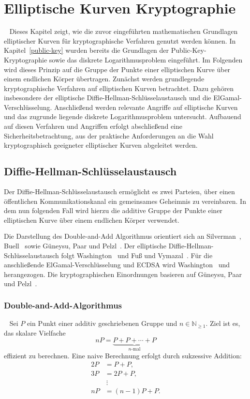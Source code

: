 \chapter{Elliptische Kurven Kryptographie}~\label{sec:kryptographie}
Dieses Kapitel zeigt, wie die zuvor eingeführten mathematischen
Grundlagen elliptischer Kurven für kryptographische Verfahren genutzt
werden können. In Kapitel~\ref{public-key} wurden bereits die Grundlagen der Public-Key-Kryptographie sowie das diskrete Logarithmusproblem eingeführt. Im Folgenden wird dieses Prinzip auf die Gruppe der Punkte einer elliptischen Kurve über einem endlichen Körper übertragen. Zunächst werden grundlegende kryptographische Verfahren auf
elliptischen Kurven betrachtet. Dazu gehören insbesondere der
elliptische Diffie-Hellman-Schlüsselaustausch und die
ElGamal-Verschlüsselung. Anschließend werden relevante Angriffe auf
elliptische Kurven und das zugrunde liegende diskrete
Logarithmusproblem untersucht. Aufbauend auf diesen Verfahren und
Angriffen erfolgt abschließend eine Sicherheitsbetrachtung, aus der
praktische Anforderungen an die Wahl kryptographisch geeigneter
elliptischer Kurven abgeleitet werden.
\section{Diffie-Hellman-Schlüsselaustausch}
Der Diffie-Hellman-Schlüsselaustausch ermöglicht es zwei Parteien,
über einen öffentlichen Kommunikationskanal ein gemeinsames Geheimnis
zu vereinbaren. In dem nun folgenden Fall wird hierzu die additive Gruppe der Punkte einer elliptischen Kurve über einem endlichen Körper
verwendet.

Die Darstellung des Double-and-Add Algorithmus orientiert sich
an Silverman~\cite[S.~30--31]{silverman06}, Buell~\cite[S.~217--218]{buell24} sowie Güneysu, Paar und Pelzl~\cite[S.~288]{guneysu24}. Der elliptische Diffie-Hellman-Schlüsselaustausch folgt Washington~\cite[S.~170--172]{washington08} und Fuß und Vymazal~\cite[S.~195]{fuß25}. Für die anschließende ElGamal-Verschlüsselung und ECDSA wird Washington~\cite[S.~174--176, 179--180]{washington08} und~\cite[104--109]{werner02} herangezogen. Die kryptographischen Einordnungen basieren auf Güneysu, Paar und Pelzl~\cite[S.~291]{guneysu24}.

\subsection{Double-and-Add-Algorithmus}~\label{sec:double-and-add}
Sei $P$ ein Punkt einer additiv geschriebenen Gruppe und
$n \in \mathbb{N}_{\geq 1}$. Ziel ist es, das skalare Vielfache
\[
    nP = \underbrace{P + P + \cdots + P}_{n\text{-mal}}
\]
effizient zu berechnen.
Eine naive Berechnung erfolgt durch sukzessive Addition:
\begin{align*}
    2P & = P + P,      \\
    3P & = 2P + P,     \\
       & \ \vdots      \\
    nP & = (n-1)P + P.
\end{align*}

